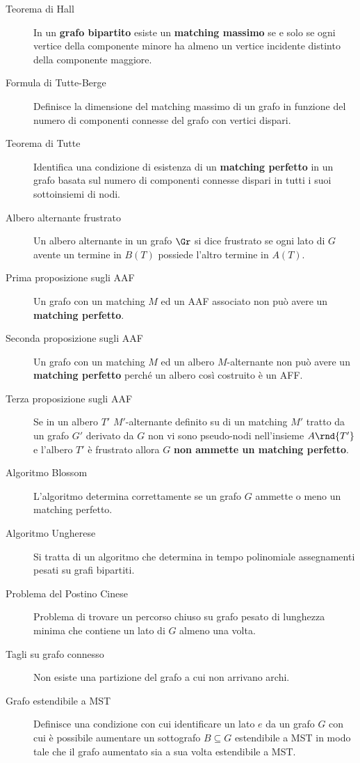 \documentclass[\main/main.tex]{subfiles}
\begin{document}
\begin{multicols}{2}
\begin{description}
		\item[Teorema di Hall] In un \textbf{grafo bipartito} esiste un \textbf{matching massimo} se e solo se ogni vertice della componente minore ha almeno un vertice incidente distinto della componente maggiore.
		\item[Formula di Tutte-Berge] Definisce la dimensione del matching massimo di un grafo in funzione del numero di componenti connesse del grafo con vertici dispari.
		\item[Teorema di Tutte] Identifica una condizione di esistenza di un \textbf{matching perfetto} in un grafo basata sul numero di componenti connesse dispari in tutti i suoi sottoinsiemi di nodi.
		\item[Albero alternante frustrato] Un albero alternante in un grafo \(\Gr \) si dice frustrato se ogni lato di \(G\) avente un termine in \(B(T)\) possiede l'altro termine in \(A(T)\).
		\item[Prima proposizione sugli AAF] Un grafo con un matching \(M\) ed un AAF associato non può avere un \textbf{matching perfetto}.
		\item[Seconda proposizione sugli AAF] Un grafo con un matching \(M\) ed un albero \(M\)-alternante non può avere un \textbf{matching perfetto} perché un albero così costruito è un AFF.
		\item[Terza proposizione sugli AAF] Se in un albero \(T'\) \(M'\)-alternante definito su di un matching \(M'\) tratto da un grafo \(G'\) derivato da \(G\) non vi sono pseudo-nodi nell'insieme \(A\rnd{T'}\) e l'albero \(T'\) è frustrato allora \(G\) \textbf{non ammette un matching perfetto}.
		\item[Algoritmo Blossom] L'algoritmo determina correttamente se un grafo \(G\) ammette o meno un matching perfetto.
		\item[Algoritmo Ungherese] Si tratta di un algoritmo che determina in tempo polinomiale assegnamenti pesati su grafi bipartiti.
		\item[Problema del Postino Cinese] Problema di trovare un percorso chiuso su grafo pesato di lunghezza minima che contiene un lato di \(G\) almeno una volta.
		\item[Tagli su grafo connesso] Non esiste una partizione del grafo a cui non arrivano archi.
		\item[Grafo estendibile a MST] Definisce una condizione con cui identificare un lato \(e\) da un grafo \(G\) con cui è possibile aumentare un sottografo \(B\subseteq G\) estendibile a MST in modo tale che il grafo aumentato sia a sua volta estendibile a MST.

\end{description}
\end{multicols}
\end{document}
